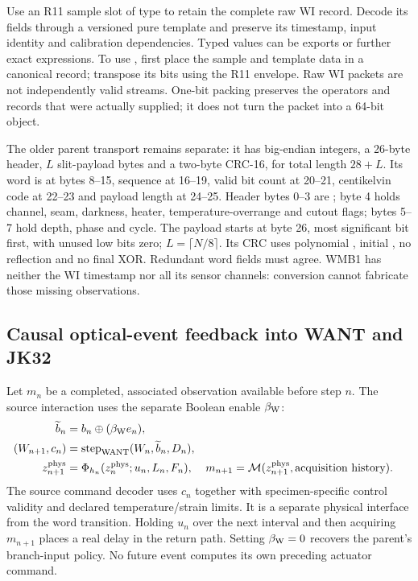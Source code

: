 Use an R11 sample slot of type  to retain the complete raw WI
record. Decode its fields through a versioned pure template and preserve its
timestamp, input identity and calibration dependencies. Typed values can be
exports or further exact expressions. To use , first place the
sample and template data in a canonical  record; transpose its
bits using the R11 envelope. Raw WI packets are not independently valid
 streams. One-bit packing preserves the operators and records
that were actually supplied; it does not turn the packet into a 64-bit object.

The older parent  transport remains separate: it has big-endian
integers, a 26-byte header, $L$ slit-payload bytes and a two-byte CRC-16, for
total length $28+L$. Its word is at bytes 8--15, sequence at 16--19, valid bit
count at 20--21, centikelvin code at 22--23 and payload length at 24--25.
Header bytes 0--3 are ; byte 4 holds channel, seam, darkness,
heater, temperature-overrange and cutout flags; bytes 5--7 hold depth, phase
and cycle. The payload starts at byte 26, most significant bit first, with
unused low bits zero; $L=\lceil N/8\rceil$. Its CRC uses polynomial
, initial , no reflection and no final XOR.
Redundant word fields must agree. WMB1 has neither the WI timestamp nor all its
sensor channels: conversion cannot fabricate those missing observations.

\subsection{Causal optical-event feedback into WANT and JK32}
Let $m_n$ be a completed, associated observation available before step $n$.
The source interaction uses the separate Boolean enable $\beta_{\rm W}$:
\begin{align}
 \widetilde b_n&=b_n\oplus(\beta_{\rm W}e_n),\\
 (W_{n+1},c_n)&=\operatorname{step}_{\rm WANT}(W_n,\widetilde b_n,D_n),\\
 z_{n+1}^{\rm phys}&=\Phi_{h_n}(z_n^{\rm phys};u_n,L_n,F_n),
 &m_{n+1}&=\mathcal M(z_{n+1}^{\rm phys},\text{acquisition history}).
\end{align}
The source command decoder uses $c_n$ together with specimen-specific control
validity and declared temperature/strain limits. It is a separate physical
interface from the word transition. Holding $u_n$ over the next interval and
then acquiring $m_{n+1}$ places a real delay in the return path. Setting
$\beta_{\rm W}=0$ recovers the parent's branch-input policy. No future event
computes its own preceding actuator command.

